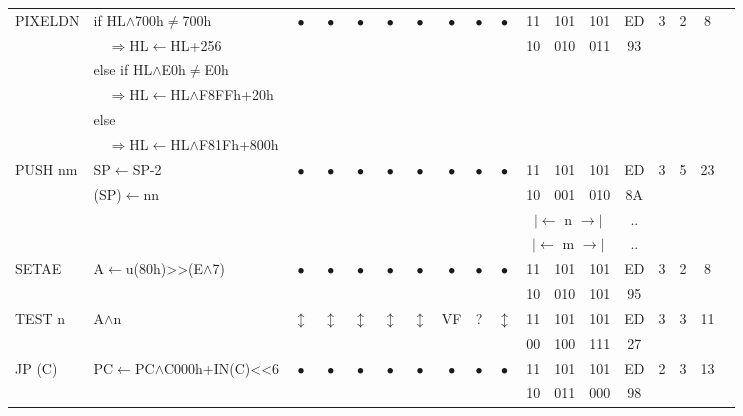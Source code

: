 \documentclass[oneside,a4paper]{book}
\begin{document}
{\begin{tabular}{llcccccccccccccccl}
		PIXELDN\instrt & 
			if HL$\wedge$700h$\neq$700h & 
			$\bullet$ & 
				$\bullet$ & 
				$\bullet$ & 
				$\bullet$ & 
				$\bullet$ & 
				$\bullet$ & 
				$\bullet$ & 
				$\bullet$ &
			11 & 101 & 101 & 
			ED & 3 &
			2 & 8 & \\
			& ~~$\Rightarrow$HL$\leftarrow$HL+256 & \multicolumn{8}{c}{} & 10 & 010 & 011 & 93 & \\
			& else if HL$\wedge$E0h$\neq$E0h & \\
			& ~~$\Rightarrow$HL$\leftarrow$HL$\wedge$F8FFh+20h & \\
			& else & \\
			& ~~$\Rightarrow$HL$\leftarrow$HL$\wedge$F81Fh+800h & \instrb \\

		PUSH nm\instrt\footnotemark[1] & 
			SP$\leftarrow$SP-2 & 
			$\bullet$ & 
				$\bullet$ & 
				$\bullet$ & 
				$\bullet$ & 
				$\bullet$ & 
				$\bullet$ & 
				$\bullet$ & 
				$\bullet$ &
			11 & 101 & 101 & 
			ED & 3 &
			5 & 23 & \\
			& (SP)$\leftarrow$nn & \multicolumn{8}{c}{} & 10 & 001 & 010 & 8A & \\
			\multicolumn{10}{c}{} & \multicolumn{3}{c}{$|\longleftarrow$ n $\longrightarrow|$} & .. & \\
			\multicolumn{10}{c}{} & \multicolumn{3}{c}{$|\longleftarrow$ m $\longrightarrow|$} & .. & \instrb \\

		SETAE\instrt & 
			A$\leftarrow$u(80h)>>(E$\wedge$7)\footnotemark[2] & 
			$\bullet$ & 
				$\bullet$ & 
				$\bullet$ & 
				$\bullet$ & 
				$\bullet$ & 
				$\bullet$ & 
				$\bullet$ & 
				$\bullet$ &
			11 & 101 & 101 & 
			ED & 3 &
			2 & 8 & \\
			\multicolumn{10}{c}{} & 10 & 010 & 101 & 95 & \instrb \\

		TEST n\footnotemark[3]\instrt & 
			A$\wedge$n & 
			$\updownarrow$ & 
				$\updownarrow$ & 
				$\updownarrow$ & 
				$\updownarrow$ & 
				$\updownarrow$ & 
				VF & 
				? & 
				$\updownarrow$ & 
			11 & 101 & 101 & 
			ED & 3 &
			3 & 11 & \\
			\multicolumn{10}{c}{} & 00 & 100 & 111 & 27 & \instrb \\

		JP (C)\instrt & 
			PC$\leftarrow$PC$\wedge$C000h+IN(C)<<6 & 
			$\bullet$ & 
				$\bullet$ & 
				$\bullet$ & 
				$\bullet$ & 
				$\bullet$ & 
				$\bullet$ & 
				$\bullet$ & 
				$\bullet$ &
			11 & 101 & 101 & 
			ED & 2 & 
			3 & 13 & \\
			\multicolumn{10}{c}{} & 10 & 011 & 000 & 98 & \instrb \\
	

\end{tabular}}
\end{document}
